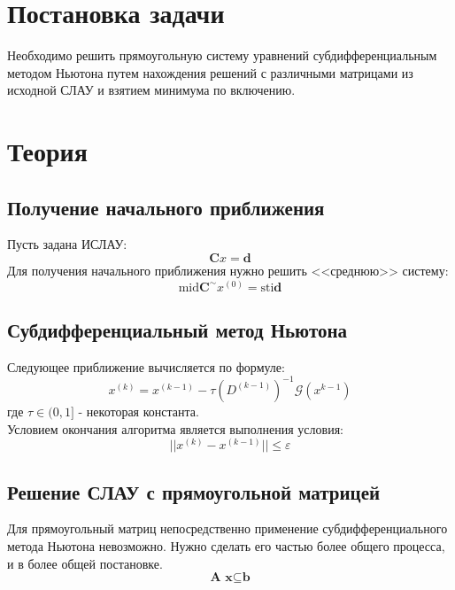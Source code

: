 
\usepackage{amsmath}

\lstset{language=Java} 




\renewcommand\contentsname{\centerline{Содержание}}
\tableofcontents
\newpage

\listoffigures
\newpage


\section{Постановка задачи}
Необходимо решить прямоугольную систему уравнений субдифференциальным методом Ньютона путем нахождения решений с различными матрицами из исходной СЛАУ и взятием минимума по включению.


\section{Теория}
\subsection{Получение начального приближения}
Пусть задана ИСЛАУ:
\begin{equation}
	\textbf{C} x = \textbf{d}
\end{equation}
Для получения начального приближения нужно решить <<среднюю>> систему:
\begin{equation}
	\text{mid} \textbf{C}^\sim x^{(0)} = \text{sti} \textbf{d}
\end{equation}

\subsection{Субдифференциальный метод Ньютона}
Следующее приближение вычисляется по формуле:
\begin{equation}
	x^{(k)} = x^{(k - 1)} - \tau (D^{(k-1)})^{-1} \mathcal{G}(x^{k - 1})
\end{equation}
где $\tau \in (0,1]$ - некоторая константа. \\

Условием окончания алгоритма является выполнения условия:
\begin{equation}
	||x^{(k)} - x^{(k - 1)}|| \leq \varepsilon
\end{equation}

\subsection{Решение СЛАУ с прямоугольной матрицей}
Для прямоугольный матриц непосредственно применение субдифференциального метода Ньютона невозможно. Нужно сделать его частью более общего процесса, и в более общей постановке.
\begin{equation}
	\textbf{A x} \subseteq \textbf{b}
\end{equation}

